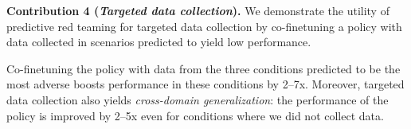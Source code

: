 \vspace{2pt}
{\bf Contribution 4 (\emph{Targeted data collection}).} We demonstrate the utility of predictive red teaming for targeted data collection by co-finetuning a policy with data collected in scenarios predicted to yield low performance. 
\vspace{2pt}

Co-finetuning the policy with data from the three conditions predicted to be the most adverse boosts performance in these conditions by 2--7x. Moreover, targeted data collection also yields \emph{cross-domain generalization}: the performance of the policy is improved by 2--5x even for conditions where we did not collect data.




